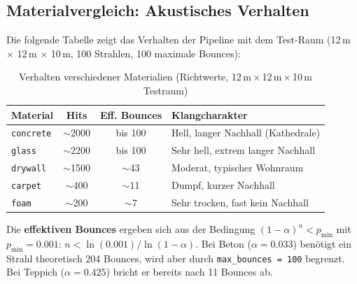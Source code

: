 \subsection{Materialvergleich: Akustisches Verhalten}

Die folgende Tabelle zeigt das Verhalten der Pipeline mit dem Test-Raum
(12\,m $\times$ 12\,m $\times$ 10\,m, 100 Strahlen, 100 maximale Bounces):

\begin{table}[H]
    \centering
    \begin{tabular}{|l|c|c|p{5cm}|}
        \hline
        \textbf{Material} & \textbf{Hits} & \textbf{Eff. Bounces} & \textbf{Klangcharakter} \\
        \hline
        \texttt{concrete} & $\sim$2000 & bis 100 & Hell, langer Nachhall (Kathedrale) \\
        \hline
        \texttt{glass}    & $\sim$2200 & bis 100 & Sehr hell, extrem langer Nachhall \\
        \hline
        \texttt{drywall}  & $\sim$1500 & $\sim$43 & Moderat, typischer Wohnraum \\
        \hline
        \texttt{carpet}   & $\sim$400  & $\sim$11 & Dumpf, kurzer Nachhall \\
        \hline
        \texttt{foam}     & $\sim$200  & $\sim$7  & Sehr trocken, fast kein Nachhall \\
        \hline
    \end{tabular}
    \caption{Verhalten verschiedener Materialien (Richtwerte, 12\,m\,$\times$\,12\,m\,$\times$\,10\,m Testraum)}
\end{table}

Die \textbf{effektiven Bounces} ergeben sich aus der Bedingung
$(1 - \alpha)^n < p_{\min}$ mit $p_{\min} = 0.001$:
$n < \ln(0.001) / \ln(1 - \alpha)$.
Bei Beton ($\alpha = 0.033$) ben\"otigt ein Strahl theoretisch 204 Bounces,
wird aber durch \texttt{max\_bounces = 100} begrenzt.
Bei Teppich ($\alpha = 0.425$) bricht er bereits nach 11 Bounces ab.






